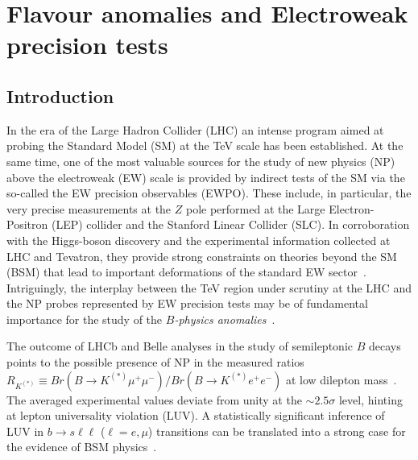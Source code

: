 
\chapter{Flavour anomalies and Electroweak precision tests}\label{chap:flav}
\section{Introduction}
\label{sec:intro}

In the era of the Large Hadron Collider (LHC) an intense program aimed at probing the Standard Model (SM) at the TeV scale {has been established}. At the same time, one of the most valuable sources for the study of new physics (NP) above the electroweak (EW) scale is provided by indirect tests of the SM via the so-called the EW precision observables (EWPO). These include, in particular, the very precise measurements at the $Z$ pole performed at the Large Electron-Positron (LEP) collider and the Stanford Linear Collider (SLC). In corroboration with the Higgs-boson discovery and the experimental information collected at LHC and Tevatron, they provide strong constraints on theories beyond the SM (BSM) that lead to important deformations of the standard EW sector~\cite{Falkowski:2013dza,Ciuchini:2013pca,Falkowski:2014tna,deBlas:2015aea,deBlas:2016ojx,deBlas:2017wmn,Haller:2018nnx,Ellis:2018gqa,Erler:2019hds,Dawson:2020oco}. Intriguingly, the interplay between the TeV region under scrutiny at the LHC and the NP probes represented by EW precision tests may be of fundamental importance for the study of the \textit{$B$-physics anomalies}~\cite{Bhattacharya:2014wla,Feruglio:2016gvd,Celis:2017doq,Buttazzo:2017ixm,Kumar:2018kmr,Ciuchini:2019usw,Aebischer:2019mlg,Cornella:2019hct}.

The outcome of LHCb and Belle analyses in the study of semileptonic $B$ decays points to the possible presence of NP in the measured ratios $R_{K^{(*)}} \equiv Br(B \to K^{(*)} \mu^{+} \mu^{-}) / Br(B \to K^{(*)} e^{+} e^{-})$ at low dilepton mass~\cite{Aaij:2014ora,Aaij:2017vbb,Aaij:2019wad,Abdesselam:2019wac}. The averaged experimental values deviate from unity at the $\sim2.5\sigma$ level, hinting at lepton universality violation (LUV). A statistically significant inference of LUV in $b \to s \ell \ell$ ($\ell = e, \mu$) transitions can be translated into a strong case for the evidence of BSM physics~\cite{Hiller:2014yaa,Hiller:2014ula,Bordone:2016gaq}.

